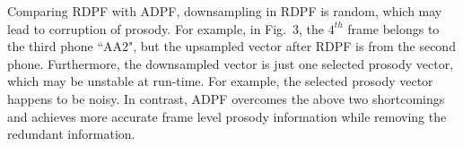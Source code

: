 \documentclass{article}
\begin{document}
Comparing RDPF with ADPF, downsampling in RDPF is random, which may lead to corruption of prosody. For example, in Fig.~3, the $4^{th}$ frame belongs to the third phone ``AA2", but the upsampled vector after RDPF is from the second phone. Furthermore, the downsampled vector is just one selected prosody vector, which may be unstable at run-time. For example, the selected prosody vector happens to be noisy. In contrast, ADPF overcomes the above two shortcomings and  achieves more accurate frame level prosody information while removing the redundant information.






\end{document}
